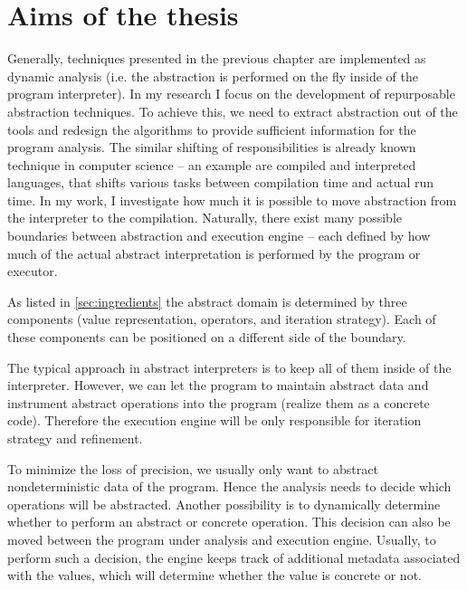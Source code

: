 \chapter{Aims of the thesis}
\label{ch:aim}


Generally, techniques presented in the previous chapter are implemented as
dynamic analysis (i.e. the abstraction is performed on the fly inside of the
program interpreter).  In my research I focus on the development of
repurposable abstraction techniques. To achieve this, we need to extract
abstraction out of the tools and redesign the algorithms to provide sufficient
information for the program analysis. The similar shifting of responsibilities
is already known technique in computer science -- an example are compiled and
interpreted languages, that shifts various tasks between compilation time and
actual run time. In my work, I investigate how much it is possible to move
abstraction from the interpreter to the compilation. Naturally, there exist
many possible boundaries between abstraction and execution engine -- each
defined by how much of the actual abstract interpretation is performed by the
program or executor.

As listed in \autoref{sec:ingredients} the abstract domain is determined by
three components (value representation, operators, and iteration strategy).
Each of these components can be positioned on a different side of the boundary.

The typical approach in abstract interpreters is to keep all of them inside of
the interpreter. However, we can let the program to maintain abstract data and
instrument abstract operations into the program (realize them as a concrete
code). Therefore the execution engine will be only responsible for iteration
strategy and refinement.

To minimize the loss of precision, we usually only want to abstract
nondeterministic data of the program. Hence the analysis needs to decide which
operations will be abstracted. Another possibility is to dynamically determine
whether to perform an abstract or concrete operation. This decision can also be
moved between the program under analysis and execution engine. Usually, to
perform such a decision, the engine keeps track of additional metadata
associated with the values, which will determine whether the value is concrete
or not.

